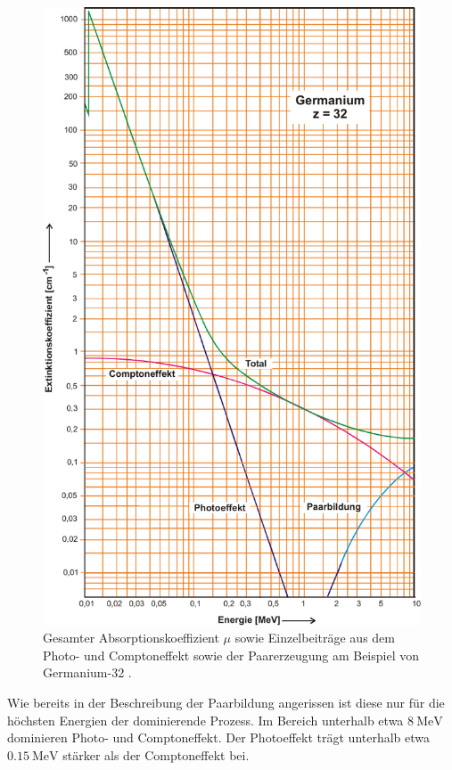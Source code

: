 \begin{figure}[H]
    \centering
    \includegraphics{figures/extinction_coefficient.pdf}
    \caption{Gesamter Absorptionskoeffizient $\mu$ sowie Einzelbeiträge aus dem Photo- und Comptoneffekt sowie der Paarerzeugung am Beispiel von Germanium-32 \cite{ap704}.} 
    \label{fig:Absorptionskoeffizient}   
\end{figure}

Wie bereits in der Beschreibung der Paarbildung angerissen ist diese nur für die höchsten Energien der dominierende Prozess.
Im Bereich unterhalb etwa $\SI{8}{\mega\eV}$ dominieren Photo- und Comptoneffekt.
Der Photoeffekt trägt unterhalb etwa $\SI{0.15}{\mega\eV}$ stärker als der Comptoneffekt bei. \\

